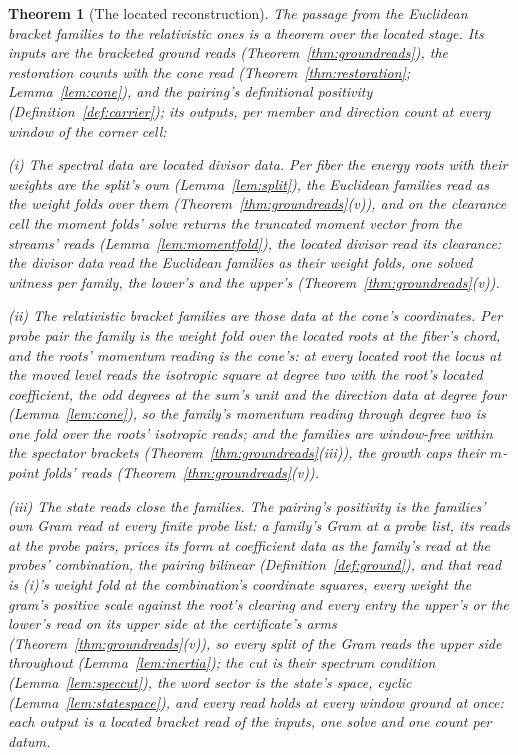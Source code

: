\documentclass[11pt]{article}
\newtheorem{theorem}{Theorem}
\theoremstyle{definition}
\begin{document}
\begin{theorem}[The located reconstruction]\label{thm:reconstruct}
The passage from the Euclidean bracket families to the
relativistic ones is a theorem over the located stage. Its
inputs are the bracketed ground reads
(Theorem~\ref{thm:groundreads}), the restoration counts with the
cone read (Theorem~\ref{thm:restoration}; Lemma~\ref{lem:cone}),
and the pairing's definitional positivity
(Definition~\ref{def:carrier}); its outputs, per member
and direction count at every window of the corner cell:

\emph{(i) The spectral data are located divisor data.} Per fiber
the energy roots with their weights are the split's own
(Lemma~\ref{lem:split}), the Euclidean families read as the
weight folds over them (Theorem~\ref{thm:groundreads}(v)), and
on the clearance cell the moment folds' solve returns the
truncated moment vector from the streams' reads
(Lemma~\ref{lem:momentfold}), the located divisor read its
clearance: the divisor data read the Euclidean families as
their weight folds, one solved witness per family, the lower's
and the upper's (Theorem~\ref{thm:groundreads}(v)).

\emph{(ii) The relativistic bracket families are those data at
the cone's coordinates.} Per probe pair the family is the weight
fold over the located roots at the fiber's chord, and the roots'
momentum reading is the cone's: at every located root the locus at
the moved level reads the isotropic square at degree two with the
root's located coefficient, the odd degrees at the sum's unit and
the direction data at degree four (Lemma~\ref{lem:cone}), so the
family's momentum reading through degree two is one fold over the
roots' isotropic reads; and the families are window-free within
the spectator brackets (Theorem~\ref{thm:groundreads}(iii)), the
growth caps their $m$-point folds' reads
(Theorem~\ref{thm:groundreads}(v)).

\emph{(iii) The state reads close the families.} The pairing's
positivity is the families' own Gram read at every finite probe
list: a family's Gram at a probe list, its reads at the probe
pairs, prices its form at coefficient data as the family's read at
the probes' combination, the pairing bilinear
(Definition~\ref{def:ground}), and that read is (i)'s weight fold
at the combination's coordinate squares, every weight the gram's
positive scale against the root's clearing and every entry the
upper's or the lower's read on its upper side at the certificate's
arms (Theorem~\ref{thm:groundreads}(v)), so every split of the
Gram reads the upper side throughout (Lemma~\ref{lem:inertia});
the cut is their spectrum condition
(Lemma~\ref{lem:speccut}), the word sector is the state's space,
cyclic (Lemma~\ref{lem:statespace}), and every read holds at
every window ground at once: each output is a located bracket
read of the inputs, one solve and one count per datum.
\end{theorem}
\end{document}
